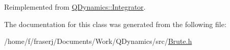 Reimplemented from \hyperlink{classQDynamics_1_1Integrator_a4effa27d56f3205e53653b1fdc5cd08e}{Q\+Dynamics\+::\+Integrator}.



The documentation for this class was generated from the following file\+:\begin{DoxyCompactItemize}
\item 
/home/f/fraserj/\+Documents/\+Work/\+Q\+Dynamics/src/\hyperlink{Brute_8h}{Brute.\+h}\end{DoxyCompactItemize}

